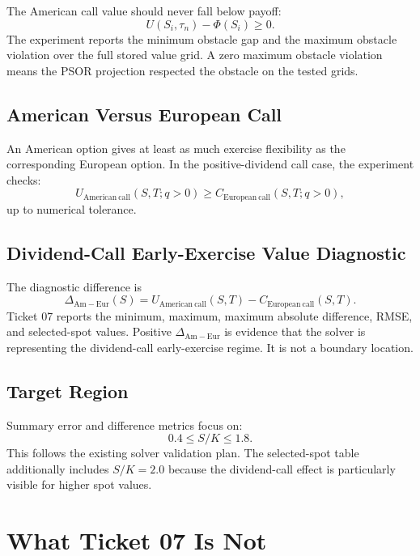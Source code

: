 \documentclass[11pt,a4paper]{article}
\begin{document}
The American call value should never fall below payoff:
\begin{equation}
  U(S_i,\tau_n) - \Phi(S_i) \geq 0.
\end{equation}
The experiment reports the minimum obstacle gap and the maximum obstacle violation over the full
stored value grid. A zero maximum obstacle violation means the PSOR projection respected the
obstacle on the tested grids.

\subsection{American Versus European Call}

An American option gives at least as much exercise flexibility as the corresponding European
option. In the positive-dividend call case, the experiment checks:
\begin{equation}
  U_{\mathrm{American\ call}}(S,T;q>0)
  \geq
  C_{\mathrm{European\ call}}(S,T;q>0),
\end{equation}
up to numerical tolerance.

\subsection{Dividend-Call Early-Exercise Value Diagnostic}

The diagnostic difference is
\begin{equation}
  \Delta_{\mathrm{Am-Eur}}(S)
  = U_{\mathrm{American\ call}}(S,T) - C_{\mathrm{European\ call}}(S,T).
\end{equation}
Ticket 07 reports the minimum, maximum, maximum absolute difference, RMSE, and selected-spot
values. Positive \(\Delta_{\mathrm{Am-Eur}}\) is evidence that the solver is representing the
dividend-call early-exercise regime. It is not a boundary location.

\subsection{Target Region}

Summary error and difference metrics focus on:
\[
  0.4 \leq S/K \leq 1.8.
\]
This follows the existing solver validation plan. The selected-spot table additionally includes
\(S/K=2.0\) because the dividend-call effect is particularly visible for higher spot values.

\section{What Ticket 07 Is Not}
\end{document}
